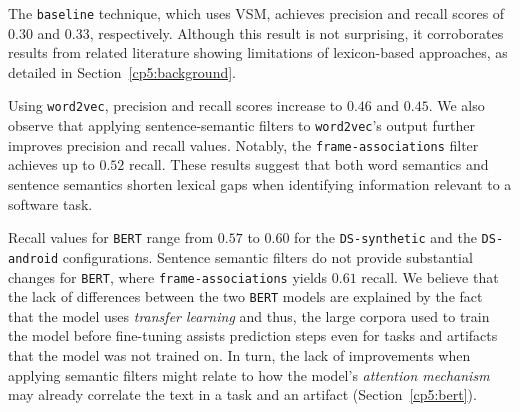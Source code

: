 



The \texttt{baseline} technique, which uses VSM, achieves precision and recall scores of $0.30$ and $0.33$, respectively. 
Although this result is not surprising, it corroborates results from related literature showing limitations of lexicon-based approaches, as detailed in Section~\ref{cp5:background}.





Using \texttt{word2vec}, precision and recall scores increase to $0.46$ and $0.45$. We also observe that applying sentence-semantic filters to \texttt{word2vec}'s output further improves precision and recall values. Notably, the 
\texttt{frame-associations} filter achieves up to $0.52$ recall. These results suggest that both word semantics and sentence
semantics shorten lexical gaps when identifying information relevant to a software task.


Recall values for 
\texttt{BERT} range from $0.57$ to $0.60$ for 
the \texttt{DS-synthetic} and the \texttt{DS-android} configurations.
Sentence semantic filters do not provide substantial changes for \texttt{BERT}, where \texttt{frame-associations} yields $0.61$ recall. 
We believe that the 
lack of differences between the two \texttt{BERT} models are explained by 
the fact that the model uses \textit{transfer learning} and thus, the  
large corpora used to train the model before fine-tuning assists prediction steps even for tasks and artifacts that the model was not trained on. In turn, the lack of improvements when applying semantic filters might relate to how the model's \textit{attention mechanism} may already correlate the text in a task and an artifact (Section~\ref{cp5:bert}).



